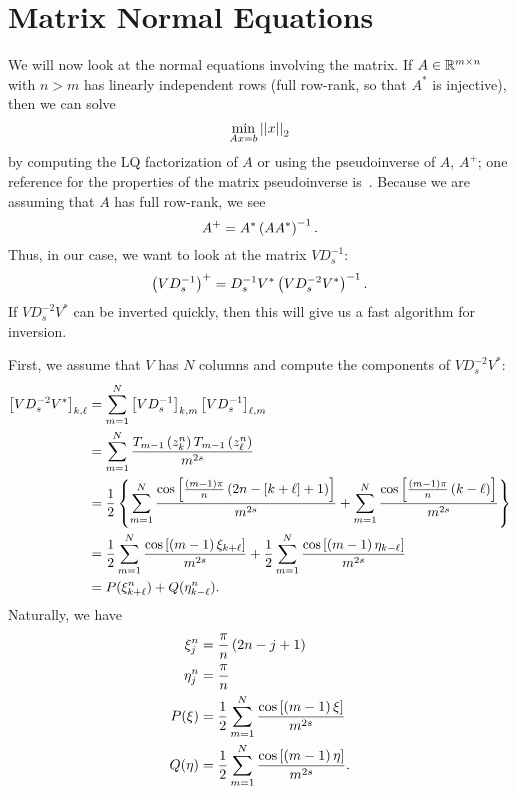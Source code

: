 \section{\CV{} Matrix Normal Equations}
\label{sec:CV_normal}

We will now look at the normal equations involving the \CV{}
matrix. If $A\in\mathbb{R}^{m\times n}$ with $n>m$ has linearly independent
rows (full row-rank, so that $A^{*}$ is injective), then we can solve
%
\begin{equation}
    \min_{Ax = b} \left| \left| x \right| \right|_{2}
\end{equation}
%
by computing the LQ factorization of $A$ or using the pseudoinverse
of $A$, $A^{+}$; one reference for the properties of the matrix pseudoinverse
is~\cite[Chapter 11]{LAaction}.
Because we are assuming that $A$ has full row-rank, we
see
\begin{equation}
    A^{+} = A^{*}\left( AA^{*} \right)^{-1}.
\end{equation}
%
Thus, in our case, we want to look at the matrix $VD_{s}^{-1}$:
%
\begin{equation}
    \left( VD_{s}^{-1} \right)^{+} = D_{s}^{-1}V^{*}\left( VD_{s}^{-2}V^{*} \right)^{-1}.
\end{equation}
%
If $VD_{s}^{-2}V^{*}$ can be inverted quickly, then this will
give us a fast algorithm for inversion.

First, we assume that $V$ has $N$ columns
and compute the components of $VD_{s}^{-2}V^{*}$:
%
\begin{align}
    \left[ VD_{s}^{-2}V^{*} \right]_{k,\ell} &= \sum_{m=1}^{N}
            \left[ VD_{s}^{-1} \right]_{k,m}\left[ VD_{s}^{-1} \right]_{\ell,m}
                    \nonumber\\
        &= \sum_{m=1}^{N} \frac{
            T_{m-1}\left( z_{k}^{n} \right)T_{m-1}\left( z_{\ell}^{n} \right)}{m^{2s}}
                    \nonumber\\
        &= \frac{1}{2}\left\{ 
            \sum_{m=1}^{N} \frac{\cos\left[ \frac{(m-1)\pi}{n}\left( 
                2n - \left[ k+\ell \right] + 1 \right) \right]}{m^{2s}}
            + \sum_{m=1}^{N} \frac{\cos\left[ \frac{(m-1)\pi}{n}\left( 
                k-\ell \right) \right]}{m^{2s}} \right\} \nonumber\\
        &= \frac{1}{2}\sum_{m=1}^{N}
                \frac{\cos\left[ \left( m-1 \right)\xi_{k+\ell} \right]}{m^{2s}}
            + \frac{1}{2}\sum_{m=1}^{N}
                \frac{\cos\left[ \left( m-1 \right)\eta_{k-\ell} \right]}{m^{2s}}
            \nonumber\\
        &= P(\xi_{k+\ell}^{n}) + Q(\eta_{k-\ell}^{n}).
\end{align}
%
Naturally, we have
%
\begin{align}
    \xi_{j}^{n} &= \frac{\pi}{n}\left( 2n - j + 1 \right) \nonumber\\
    \eta_{j}^{n} &= \frac{\pi}{n} \nonumber\\
    P(\xi) &= \frac{1}{2}\sum_{m=1}^{N}
                \frac{\cos\left[ \left( m-1 \right)\xi \right]}{m^{2s}}
        \nonumber\\
    Q(\eta) &= \frac{1}{2}\sum_{m=1}^{N}
                \frac{\cos\left[ \left( m-1 \right)\eta \right]}{m^{2s}}.
\end{align}


